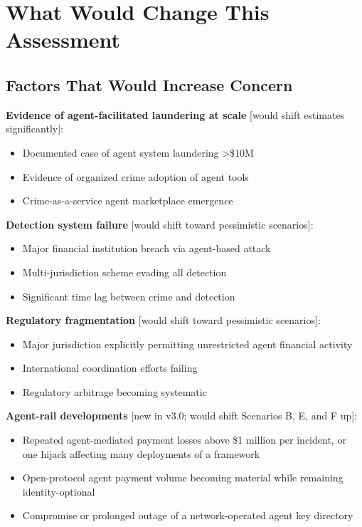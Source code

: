 \documentclass[11pt,letterpaper]{article}
\begin{document}
\section{What Would Change This Assessment}
\label{sec:change}

\subsection{Factors That Would Increase Concern}

\textbf{Evidence of agent-facilitated laundering at scale} [would shift estimates significantly]:
\begin{itemize}
  \item Documented case of agent system laundering >\$10M
  \item Evidence of organized crime adoption of agent tools
  \item Crime-as-a-service agent marketplace emergence
\end{itemize}

\textbf{Detection system failure} [would shift toward pessimistic scenarios]:
\begin{itemize}
  \item Major financial institution breach via agent-based attack
  \item Multi-jurisdiction scheme evading all detection
  \item Significant time lag between crime and detection
\end{itemize}

\textbf{Regulatory fragmentation} [would shift toward pessimistic scenarios]:
\begin{itemize}
  \item Major jurisdiction explicitly permitting unrestricted agent financial activity
  \item International coordination efforts failing
  \item Regulatory arbitrage becoming systematic
\end{itemize}

\textbf{Agent-rail developments} [new in v3.0; would shift Scenarios B, E, and F up]:
\begin{itemize}
  \item Repeated agent-mediated payment losses above \$1 million per incident, or one hijack affecting many deployments of a framework
  \item Open-protocol agent payment volume becoming material while remaining identity-optional
  \item Compromise or prolonged outage of a network-operated agent key directory
\end{itemize}
\end{document}
